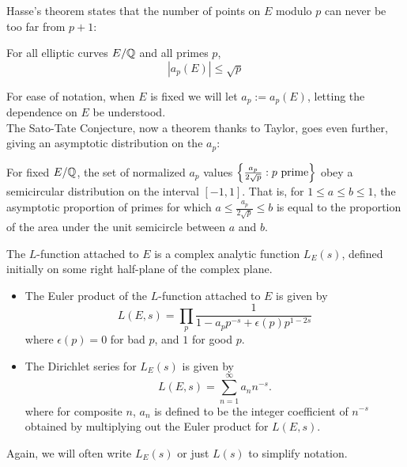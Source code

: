 \documentclass[10pt]{article}
\newcommand{\Les}{L_E(s)}
\begin{document}
Hasse's theorem states that the number of points on $E$ modulo $p$ can never be too far from $p+1$:
\begin{theorem}[Hasse, 1936]
For all elliptic curves $E/\mathbb{Q}$ and all primes $p$,
\begin{equation}
|a_p(E)| \le \sqrt{p}
\end{equation}
\end{theorem}

For ease of notation, when $E$ is fixed we will let $a_p := a_p(E)$, letting the dependence on $E$ be understood. \\

The Sato-Tate Conjecture, now a theorem thanks to Taylor, goes even further, giving an asymptotic distribution on the $a_p$:
\begin{theorem}[Taylor, 2006-]
For fixed $E/\mathbb{Q}$, the set of normalized $a_p$ values $\left\{\frac{a_p}{2\sqrt{p}}: p \text{ prime}\right\}$ obey a semicircular distribution on the interval $[-1,1]$. That is, for $1\le a \le b \le 1$, the asymptotic proportion of primes for which $a \le \frac{a_p}{2\sqrt{p}} \le b$ is equal to the proportion of the area under the unit semicircle between $a$ and $b$.
\end{theorem}

\begin{definition} \mbox{}

The $L$-function attached to $E$ is a complex analytic function $L_E(s)$, defined initially on some right half-plane of the complex plane.
\begin{itemize}
\item The Euler product of the $L$-function attached to $E$ is given by
\begin{equation}
L(E,s) = \prod_{p} \frac{1}{1 - a_p p^{-s} + \epsilon(p)p^{1-2s}}
\end{equation}
where $\epsilon(p) = 0$ for bad $p$, and $1$ for good $p$.
\item The Dirichlet series for $L_E(s)$ is given by
\begin{equation}
L(E,s) = \sum_{n=1}^{\infty} a_n n^{-s}.
\end{equation}
where for composite $n$, $a_n$ is defined to be the integer coefficient of $n^{-s}$ obtained by multiplying out the Euler product for $L(E,s)$.
\end{itemize}
\end{definition}
Again, we will often write $\Les$ or just $L(s)$ to simplify notation. \\
\end{document}

